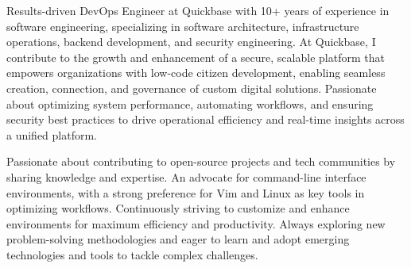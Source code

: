 

\begin{cvparagraph}

Results-driven DevOps Engineer at Quickbase with 10+ years of experience in software engineering, specializing in software architecture, infrastructure operations, backend development, and security engineering. At Quickbase, I contribute to the growth and enhancement of a secure, scalable platform that empowers organizations with low-code citizen development, enabling seamless creation, connection, and governance of custom digital solutions. Passionate about optimizing system performance, automating workflows, and ensuring security best practices to drive operational efficiency and real-time insights across a unified platform.

Passionate about contributing to open-source projects and tech communities by sharing knowledge and expertise. An advocate for command-line interface environments, with a strong preference for Vim and Linux as key tools in optimizing workflows. Continuously striving to customize and enhance environments for maximum efficiency and productivity. Always exploring new problem-solving methodologies and eager to learn and adopt emerging technologies and tools to tackle complex challenges.
\end{cvparagraph}
